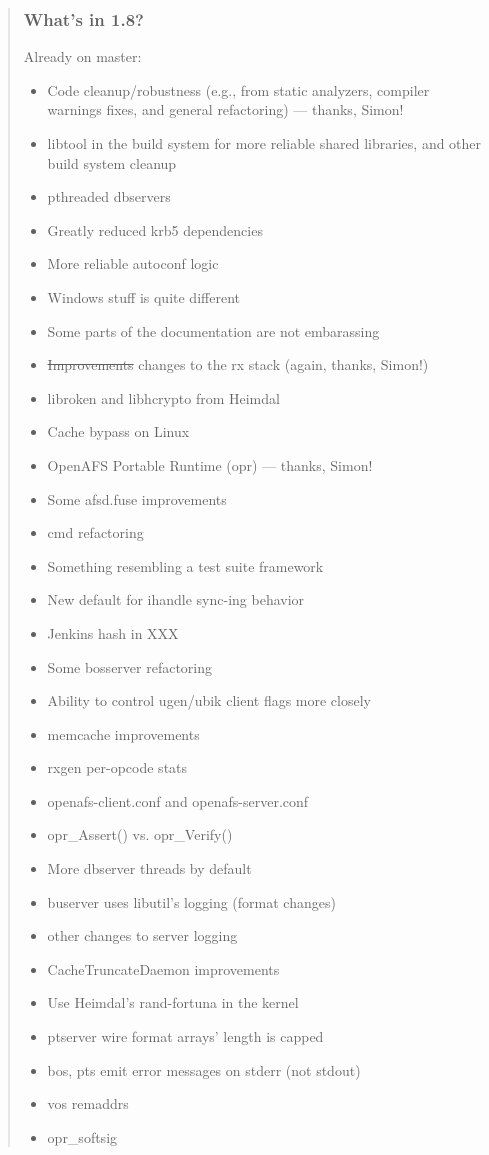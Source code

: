 \documentclass{beamer}
\begin{document}
\begin{frame}[fragile]
\begin{quote}
\begin{frame}
\frametitle{What's in 1.8?}
Already on master:
\begin{itemize}
\item{Code cleanup/robustness (e.g., from static analyzers, compiler
warnings fixes, and general refactoring) --- thanks, Simon!}
\item{libtool in the build system for more reliable shared libraries,
and other build system cleanup}
\item{pthreaded dbservers}
\item{Greatly reduced krb5 dependencies}
\item{More reliable autoconf logic}
\item{Windows stuff is quite different}
\item{Some parts of the documentation are not embarassing}
\item{\sout{Improvements} changes to the rx stack (again, thanks, Simon!)}
\item{libroken and libhcrypto from Heimdal}
\item{Cache bypass on Linux}
\item{OpenAFS Portable Runtime (opr) --- thanks, Simon!}
\item{Some afsd.fuse improvements}
\item{cmd refactoring}
\item{Something resembling a test suite framework}
\item{New default for ihandle sync-ing behavior}
\item{Jenkins hash in XXX}
\item{Some bosserver refactoring}
\item{Ability to control ugen/ubik client flags more closely}
\item{memcache improvements}
\item{rxgen per-opcode stats}
\item{openafs-client.conf and openafs-server.conf}
\item{opr_Assert() vs. opr_Verify()}
\item{More dbserver threads by default}
\item{buserver uses libutil's logging (format changes)}
\item{other changes to server logging}
\item{CacheTruncateDaemon improvements}
\item{Use Heimdal's rand-fortuna in the kernel}
\item{ptserver wire format arrays' length is capped}
\item{bos, pts emit error messages on stderr (not stdout)}
\item{vos remaddrs}
\item{opr_softsig}
\end{itemize}
\end{frame}


\end{quote}
\end{frame}
\end{document}
